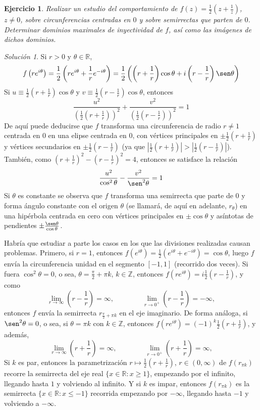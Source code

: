 \documentclass[11pt]{report}
\newcommand{\R}{\mathbb R}
\newcommand{\Z}{\mathbb Z}
\newcommand{\pars}[1]{\left( #1 \right)} %
\newtheorem{exercise}{Ejercicio}
\theoremstyle{remark}
\newtheorem*{resolution}{Solución}
\begin{document}
\begin{exercise}
Realizar un estudio del comportamiento de $f(z) = \frac{1}{2}(z+\frac{1}{z})$, $z \neq 0$, sobre circunferencias centradas en $0$ y sobre semirrectas que parten de $0$. Determinar dominios maximales de inyectividad de $f$, así como las imágenes de dichos dominios.
\end{exercise}

\begin{resolution}
Si $r>0$ y $\theta \in \R$,
\[f\pars{re^{i\theta}} =\frac{1}{2}\pars{re^{i\theta}+\frac{1}{r}e^{-i\theta}} = \frac{1}{2}\pars{\pars{r+\frac{1}{r}}\cos\theta+i\pars{r-\frac{1}{r}}\sen\theta}\]
Si $ u \equiv \frac{1}{2}\pars{r+\frac{1}{r}}\cos\theta$ y $v \equiv \frac{1}{2}\pars{r-\frac{1}{r}}\cos\theta$, entonces
\[\frac{u^2}{\pars{\frac{1}{2}\pars{r+\frac{1}{r}}}^2}+\frac{v^2}{\pars{\frac{1}{2}\pars{r-\frac{1}{r}}}^2}=1\]
De aquí puede deducirse que $f$ transforma una circunferencia de radio $r \neq 1$ centrada en $0$ en una elipse centrada en $0$, con vértices principales en $\pm{\frac{1}{2}(r+\frac{1}{r})}$ y vértices secundarios en $\pm{\frac{1}{2}(r-\frac{1}{r})}$ (ya que $|\frac{1}{2}(r+\frac{1}{r})|>|\frac{1}{2}(r-\frac{1}{r})|$). También, como $(r+\frac{1}{r})^2-(r-\frac{1}{r})^2 = 4$, entonces se satisface la relación
\[\frac{u^2}{\cos^2\theta}-\frac{v^2}{\sen^2\theta} = 1\]
Si $\theta$ es constante se observa que $f$ transforma una semirrecta que parte de $0$ y forma ángulo constante con el origen $\theta$ (se llamará, de aquí en adelante, $r_\theta$) en una hipérbola centrada en cero con vértices principales en $\pm{\cos\theta}$ y asíntotas de pendientes $\pm{\frac{\sen\theta}{\cos\theta}}$.

Habría que estudiar a parte los casos en los que las divisiones realizadas causan problemas. Primero, si $r = 1$, entonces $f(e^{i\theta}) = \frac{1}{2}(e^{i\theta}+e^{-i\theta}) = \cos\theta$, luego $f$ envía la circunferencia unidad en el segmento $[-1,1]$ (recorrido dos veces). Si fuera $\cos^2\theta = 0$, o sea, $\theta = \frac{\pi}{2}+\pi k$, $k \in \Z$, entonces $f(re^{i\theta})=i\frac{1}{2}(r-\frac{1}{r})$, y como
\[\lim_{r \to \infty}\pars{r-\frac{1}{r}}= \infty, \qquad\qquad \lim_{r \to 0^+} \pars{r-\frac{1}{r}} = -\infty,\]
entonces $f$ envía la semirrecta $r_{\frac{\pi}{2}+\pi k}$ en el eje imaginario. De forma análoga, si $\sen^2\theta = 0$, o sea, si $\theta = \pi k$ con $k \in \Z$, entonces $f(re^{i\theta}) = (-1)^k\frac{1}{2}(r+\frac{1}{r})$, y además,
\[\lim_{r \to \infty}\pars{r+\frac{1}{r}}= \infty, \qquad\qquad \lim_{r \to 0^+} \pars{r+\frac{1}{r}} = \infty,\]
Si $k$ es par, entonces la parametrización $r \mapsto \frac{1}{2}(r+\frac{1}{r})$, $ r \in (0,\infty)$ de $f(r_{\pi k})$ recorre la semirrecta del eje real $\{x \in \R \colon x \geq 1\}$, empezando por el infinito, llegando hasta $1$ y volviendo al infinito. Y si $k$ es impar, entonces $f(r_{\pi k})$ es la semirrecta $\{x \in \R \colon x \leq -1\}$ recorrida empezando por $-\infty$, llegando hasta $-1$ y volviendo a $-\infty$.


\end{resolution}
\end{document}
